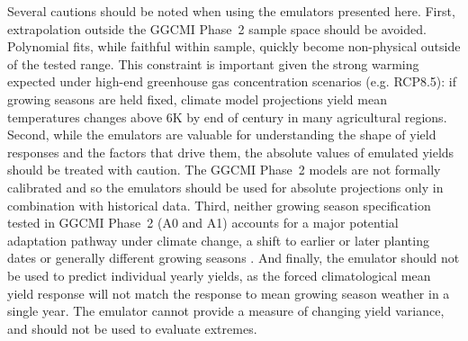 \documentclass[gmdd]{copernicus} %
\begin{document}
Several cautions should be noted when using the emulators presented here. 
First, extrapolation outside the GGCMI Phase~2 sample space should be avoided.
Polynomial fits, while faithful within sample, quickly become non-physical outside of the tested range. 
This constraint is important given the strong warming expected under high-end greenhouse gas concentration scenarios (e.g. RCP8.5): if growing seasons are held fixed, climate model projections yield mean temperatures changes above 6K by end of century in many agricultural regions. 
Second, while the emulators are valuable for understanding the shape of yield responses and the factors that drive them, the absolute values of emulated yields should be treated with caution. 
The GGCMI Phase~2 models are not formally calibrated and so the emulators should be used for absolute projections only in combination with historical data.
Third, neither growing season specification tested in GGCMI Phase~2 (A0 and A1) accounts for a major potential adaptation pathway under climate change, a shift to earlier or later planting dates \citep{waha2012} or generally different growing seasons \citep{minoli2019modeling}. 
And finally, the emulator should not be used to predict individual yearly yields, as the forced climatological mean yield response will not match the response to mean growing season weather in a single year. The emulator cannot provide a measure of changing yield variance, and should not be used to evaluate extremes.
\end{document}
